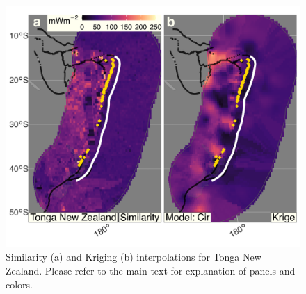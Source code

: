 \begin{figure}[htbp]

{\centering \includegraphics[width=1\linewidth,]{assets/figs/chpt3/TongaNewZealandDiffComp} 

}

\caption[Similarityand Kriging interpolations for Tonga New Zealand]{Similarity (a) and Kriging (b) interpolations for Tonga New Zealand. Please refer to the main text for explanation of panels and colors.}\label{fig:tongaNewZealandDiff}
\end{figure}

